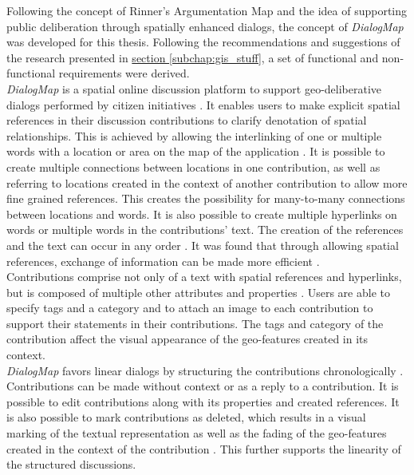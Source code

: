 Following the concept of Rinner's Argumentation Map \cite{Rinner_ArgumentationMaps} and the idea of supporting public deliberation through spatially enhanced dialogs, the concept of \textit{DialogMap} was developed for this thesis. Following the recommendations and suggestions of the research presented in \hyperref[subchap:gis_stuff]{section \ref{subchap:gis_stuff}}, a set of functional and non-functional requirements were derived.\\
\textit{DialogMap} is a spatial online discussion platform to support geo-deliberative dialogs performed by citizen initiatives \cite{Cai2009_spatial_annotation_deliberation}. It enables users to make explicit spatial references in their discussion contributions to clarify denotation of spatial relationships. This is achieved by allowing the interlinking of one or multiple words with a location or area on the map of the application \cite{Rinner_ArgumentationMaps}. It is possible to create multiple connections between locations in one contribution, as well as referring to locations created in the context of another contribution \cite{Kessler2005_ArgumentationMapPrototype,Voss2004_Evolution_PGIS,you2009_participatory_map_based,Cai2009_spatial_annotation_deliberation} to allow more fine grained references. This creates the possibility for many-to-many connections between locations and words. It is also possible to create multiple hyperlinks on words or multiple words in the contributions' text. The creation of the references and the text can occur in any order \cite{Voss2004_Evolution_PGIS}. It was found that through allowing spatial references, exchange of information can be made more efficient \cite{Cherubini2007_shared_maps}.\\
Contributions comprise not only of a text with spatial references and hyperlinks, but is composed of multiple other attributes and properties \cite{Longueville2010_community_based_geoportals_web20,Kessler2005_ArgumentationMapPrototype,Kessler2005_Conflict_Resolution}. Users are able to specify tags and a category and to attach an image to each contribution \cite{Tang2005_PPGIS_discussion_forum,zhao2006geodf,you2009_participatory_map_based,Cai2009_spatial_annotation_deliberation} to support their statements in their contributions. The tags and category of the contribution affect the visual appearance of the geo-features created in its context.\\
\textit{DialogMap} favors linear dialogs by structuring the contributions chronologically \cite{Cherubini2007_shared_maps,you2009_participatory_map_based}. Contributions can be made without context or as a reply to a contribution. It is possible to edit contributions along with its properties and created references. It is also possible to mark contributions as deleted, which results in a visual marking of the textual representation as well as the fading of the geo-features created in the context of the contribution \cite{Hopfer2007_Communication}. This further supports the linearity of the structured discussions.\\
